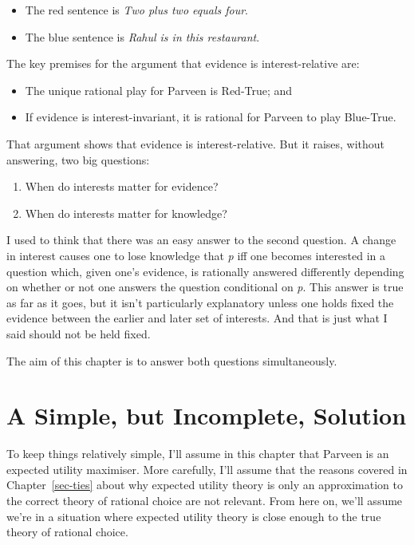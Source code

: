 \documentclass[
  10pt,
  letterpaper,
  twoside]{scrbook}
\providecommand{\tightlist}{%
  \setlength{\itemsep}{0pt}\setlength{\parskip}{0pt}}\usepackage{longtable,booktabs,array}
\begin{document}
\begin{itemize}
\tightlist
\item
  The red sentence is \emph{Two plus two equals four}.
\item
  The blue sentence is \emph{Rahul is in this restaurant}.
\end{itemize}

The key premises for the argument that evidence is interest-relative
are:

\begin{itemize}
\tightlist
\item
  The unique rational play for Parveen is Red-True; and
\item
  If evidence is interest-invariant, it is rational for Parveen to play
  Blue-True.
\end{itemize}

That argument shows that evidence is interest-relative. But it raises,
without answering, two big questions:

\begin{enumerate}
\def\labelenumi{\arabic{enumi}.}
\tightlist
\item
  When do interests matter for evidence?
\item
  When do interests matter for knowledge?
\end{enumerate}

I used to think that there was an easy answer to the second question. A
change in interest causes one to lose knowledge that \emph{p} iff one
becomes interested in a question which, given one's evidence, is
rationally answered differently depending on whether or not one answers
the question conditional on \emph{p}. This answer is true as far as it
goes, but it isn't particularly explanatory unless one holds fixed the
evidence between the earlier and later set of interests. And that is
just what I said should not be held fixed.

The aim of this chapter is to answer both questions simultaneously.

\section{A Simple, but Incomplete, Solution}\label{sec-simplesolution}

To keep things relatively simple, I'll assume in this chapter that
Parveen is an expected utility maximiser. More carefully, I'll assume
that the reasons covered in Chapter~\ref{sec-ties} about why expected
utility theory is only an approximation to the correct theory of
rational choice are not relevant. From here on, we'll assume we're in a
situation where expected utility theory is close enough to the true
theory of rational choice.
\end{document}
